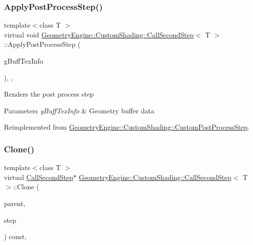 \subsubsection{\texorpdfstring{ApplyPostProcessStep()}{ApplyPostProcessStep()}}
{\footnotesize\ttfamily template$<$class T $>$ \\
virtual void \mbox{\hyperlink{class_geometry_engine_1_1_custom_shading_1_1_call_second_step}{Geometry\+Engine\+::\+Custom\+Shading\+::\+Call\+Second\+Step}}$<$ T $>$\+::Apply\+Post\+Process\+Step (\begin{DoxyParamCaption}\item[{const \mbox{\hyperlink{class_geometry_engine_1_1_g_buffer_texture_info}{G\+Buffer\+Texture\+Info}} \&}]{g\+Buff\+Tex\+Info }\end{DoxyParamCaption})\hspace{0.3cm}{\ttfamily [inline]}, {\ttfamily [protected]}, {\ttfamily [virtual]}}

Renders the post process step 
\begin{DoxyParams}{Parameters}
{\em g\+Buff\+Tex\+Info} & Geometry buffer data \\
\hline
\end{DoxyParams}


Reimplemented from \mbox{\hyperlink{class_geometry_engine_1_1_custom_shading_1_1_custom_post_process_step_a7d3a13a14a98277673dc52c74e38f038}{Geometry\+Engine\+::\+Custom\+Shading\+::\+Custom\+Post\+Process\+Step}}.

\mbox{\label{class_geometry_engine_1_1_custom_shading_1_1_call_second_step_ae8f56f4c458d1916198fe5c2cdd3b9e9}} 
\subsubsection{\texorpdfstring{Clone()}{Clone()}}
{\footnotesize\ttfamily template$<$class T $>$ \\
virtual \mbox{\hyperlink{class_geometry_engine_1_1_custom_shading_1_1_call_second_step}{Call\+Second\+Step}}$\ast$ \mbox{\hyperlink{class_geometry_engine_1_1_custom_shading_1_1_call_second_step}{Geometry\+Engine\+::\+Custom\+Shading\+::\+Call\+Second\+Step}}$<$ T $>$\+::Clone (\begin{DoxyParamCaption}\item[{\mbox{\hyperlink{class_geometry_engine_1_1_custom_shading_1_1_custom_post_process_step_interface}{Custom\+Post\+Process\+Step\+Interface}} $\ast$}]{parent,  }\item[{\mbox{\hyperlink{namespace_geometry_engine_1_1_custom_shading_a09e44ca81de5fe08c6d50271d680c4b1}{Custom\+Post\+Process\+Steps}}}]{step }\end{DoxyParamCaption}) const\hspace{0.3cm}{\ttfamily [inline]}, {\ttfamily [virtual]}}

